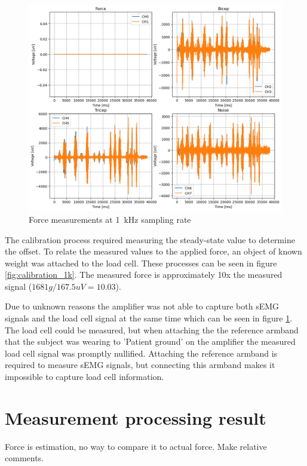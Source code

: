 \begin{figure}[h!t]
	\begin{center}
		\includegraphics[width=1.0\columnwidth]{images/measurement_meting2_1k.png}
	\end{center}
	\caption{Force measurements at \SI{1}{\kilo\hertz} sampling rate}
	\label{fig:measurement_1k}
\end{figure}

The calibration process required measuring the steady-state value to determine the offset. To relate the measured values to the applied force, an object of known weight was attached to the load cell. These processes can be seen in figure \ref{fig:calibration_1k}. The measured force is approximately 10x the measured signal ($1681g / 167.5 uV = 10.03$).

Due to unknown reasons the amplifier was not able to capture both sEMG signals and the load cell signal at the same time which can be seen in figure \ref{fig:measurement_1k}. The load cell could be measured, but when attaching the the reference armband that the subject was wearing to 'Patient ground' on the amplifier the measured load cell signal was promptly nullified. Attaching the reference armband is required to measure sEMG signals, but connecting this armband makes it impossible to capture load cell information.

\section{Measurement processing result}
Force is estimation, no way to compare it to actual force. Make relative comments.

